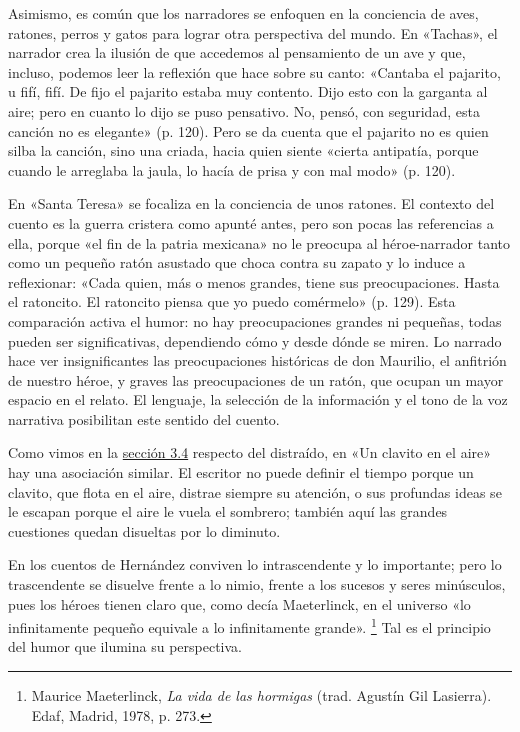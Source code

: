 \documentclass[14pt,twoside,final]{extbook} %
\let\oldfootnote\footnote
\renewcommand\footnote[1]{%
\oldfootnote{\hspace{1mm}#1}}
\begin{document}
Asimismo, es común que los narradores se enfoquen en la conciencia de aves, ratones, perros y gatos para lograr otra perspectiva del mundo. En «Tachas», el narrador crea la ilusión de que accedemos al pensamiento de un ave y que, incluso, podemos leer la reflexión que hace sobre su canto: «Cantaba el pajarito, u fifí, fifí. De fijo el pajarito estaba muy contento. Dijo esto con la garganta al aire; pero en cuanto lo dijo se puso pensativo. No, pensó, con seguridad, esta canción no es elegante» (p. 120). Pero se da cuenta que el pajarito no es quien silba la canción, sino una criada, hacia quien siente «cierta antipatía, porque cuando le arreglaba la jaula, lo hacía de prisa y con mal modo» (p. 120).

En «Santa Teresa» se focaliza en la conciencia de unos ratones. El contexto del cuento es la guerra cristera como apunté antes, pero son pocas las referencias a ella, porque «el fin de la patria mexicana» no le preocupa al héroe-narrador tanto como un pequeño ratón asustado que choca contra su zapato y lo induce a reflexionar: «Cada quien, más o menos grandes, tiene sus preocupaciones. Hasta el ratoncito. El ratoncito piensa que yo puedo comérmelo» (p. 129). Esta comparación activa el humor: no hay preocupaciones grandes ni pequeñas, todas pueden ser significativas, dependiendo cómo y desde dónde se miren. Lo narrado hace ver insignificantes las preocupaciones históricas de don Maurilio, el anfitrión de nuestro héroe, y graves las preocupaciones de un ratón, que ocupan un mayor espacio en el relato. El lenguaje, la selección de la información y el tono de la voz narrativa posibilitan este
sentido del cuento.

Como vimos en la \hyperref[sec:el-distraido]{sección 3.4} respecto del distraído, en «Un clavito en el aire» hay una asociación similar. El escritor no puede definir el tiempo porque un clavito, que flota en el aire, distrae siempre su atención, o sus profundas ideas se le escapan porque el aire le vuela el sombrero; también aquí las grandes cuestiones quedan disueltas por lo diminuto.

En los cuentos de Hernández conviven lo intrascendente y lo importante; pero lo trascendente se disuelve frente a lo nimio, frente a los sucesos y seres minúsculos, pues los héroes tienen claro que, como decía Maeterlinck, en el universo «lo infinitamente pequeño equivale a lo infinitamente grande».\footnote{Maurice Maeterlinck, \emph{La vida de las hormigas} (trad. Agustín Gil Lasierra). Edaf, Madrid, 1978, p. 273.} Tal es el principio del humor que ilumina su perspectiva.
\end{document}
